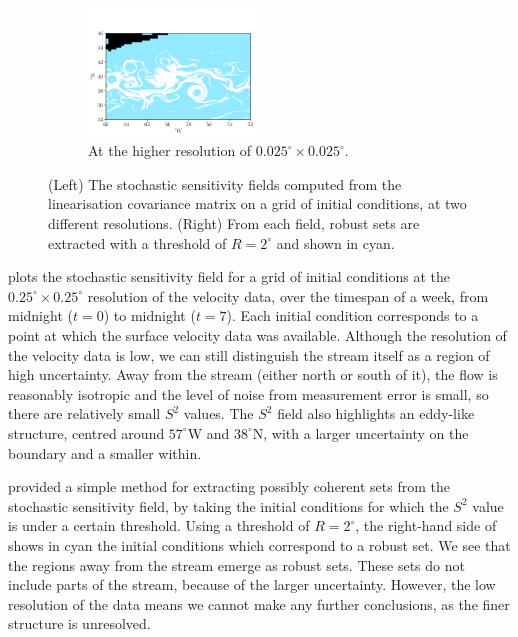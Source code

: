 \begin{figure}
\begin{subfigure}{\textwidth}
		\includegraphics[width=0.49\textwidth]{chp06_applications/figures/gulf_stream/S2_robust_high_2.0}
		\caption{At the higher resolution of \(0.025^\circ \times 0.025^\circ\).}
		\label{fig:na_s2_high}
	\end{subfigure}
	\caption{(Left) The stochastic sensitivity fields computed from the linearisation covariance matrix on a grid of initial conditions, at two different resolutions.
		(Right) From each field, robust sets are extracted with a threshold of \(R = 2^\circ\) and shown in cyan.
	}
	\label{fig:na_s2}
\end{figure}

 plots the stochastic sensitivity field for a grid of initial conditions at the \(0.25^\circ \times 0.25^\circ\) resolution of the velocity data, over the timespan of a week, from midnight  (\(t = 0\)) to midnight  (\(t = 7\)).
Each initial condition corresponds to a point at which the surface velocity data was available.
Although the resolution of the velocity data is low, we can still distinguish the stream itself as a region of high uncertainty.
Away from the stream (either north or south of it), the flow is reasonably isotropic and the level of noise from measurement error is small, so there are relatively small \(S^2\) values.
The \(S^2\) field also highlights an eddy-like structure, centred around \(57^\circ\)W and \(38^\circ\)N, with a larger uncertainty on the boundary and a smaller within.

\citet{Balasuriya_2020_StochasticSensitivityComputable} provided a simple method for extracting possibly coherent sets from the stochastic sensitivity field, by taking the initial conditions for which the \(S^2\) value is under a certain threshold.
Using a threshold of \(R = 2^\circ\), the right-hand side of  shows in cyan the initial conditions which correspond to a robust set.
We see that the regions away from the stream emerge as robust sets.
These sets do not include parts of the stream, because of the larger uncertainty.
However, the low resolution of the data means we cannot make any further conclusions, as the finer structure is unresolved.


